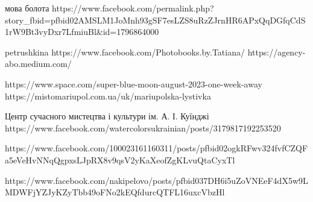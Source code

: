 мова болота
https://www.facebook.com/permalink.php?story_fbid=pfbid02AMSLM1JoMnh93gSF7esLZS8uRzZJrnHR6APxQqDGfqCdS1rW9Bt3vyDxr7LfmiuBl&id=1796864000

petrushkina
https://www.facebook.com/Photobooks.by.Tatiana/
https://agency-abo.medium.com/%

https://www.space.com/super-blue-moon-august-2023-one-week-away
https://mistomariupol.com.ua/uk/mariupolska-lystivka

Центр сучасного мистецтва і культури ім. А. І. Куїнджі
https://www.facebook.com/watercolorsukrainian/posts/3179817192253520

https://www.facebook.com/100023161160311/posts/pfbid02ogkRFwv324fvfCZQFa5eVeHvNNqQgpxsLJpRX8v9qsV2yKaXeofZgKLvuQtaCyxTl

https://www.facebook.com/nakipelovo/posts/pfbid037DH6i5uZoVNEeF4dX5w9LMDWFjYZJyKZyTbb49oFNo2kEQfdurcQTFL16uxcVbzHl
